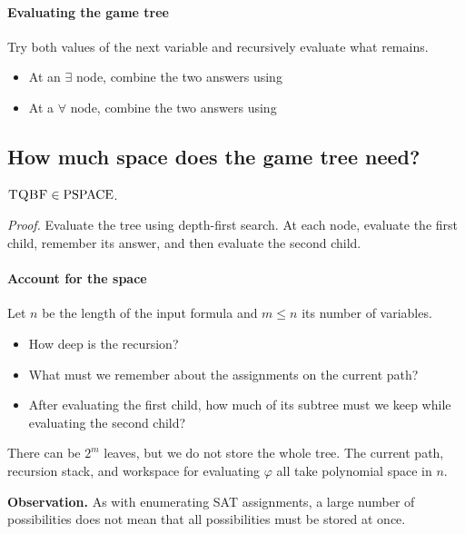 \documentclass[11  pt]{article}
\begin{document}
\paragraph{Evaluating the game tree}
Try both values of the next variable and recursively evaluate what remains.
\begin{itemize}
    \item At an $\exists$ node, combine the two answers using 
    \item At a $\forall$ node, combine the two answers using 
\end{itemize}

\newpage
\subsection*{How much space does the game tree need?}
\begin{theorem}
    $\textsc{TQBF}\in\mathrm{PSPACE}$.
\end{theorem}

\textit{Proof.} Evaluate the tree using depth-first search. At each node, evaluate the first child, remember its answer, and then evaluate the second child.

\paragraph{Account for the space}
Let $n$ be the length of the input formula and $m\leq n$ its number of variables.
\begin{itemize}
    \item How deep is the recursion? 
    \vs{.5cm}
    \item What must we remember about the assignments on the current path?
    \vs{1cm}
    \item After evaluating the first child, how much of its subtree must we keep while evaluating the second child?
    \vs{1cm}
\end{itemize}

There can be $2^m$ leaves, but we do not store the whole tree. The current path, recursion stack, and workspace for evaluating $\varphi$ all take polynomial space in $n$.

\vfill
\textbf{Observation.} As with enumerating SAT assignments, a large number of possibilities does not mean that all possibilities must be stored at once.
\end{document}
